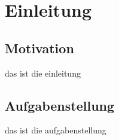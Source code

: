 \chapter{Einleitung}

\section{Motivation}
\label{sec:Sektion 11}
das ist die einleitung
\section{Aufgabenstellung}
\label{sec:Sektion 12}
das ist die aufgabenstellung